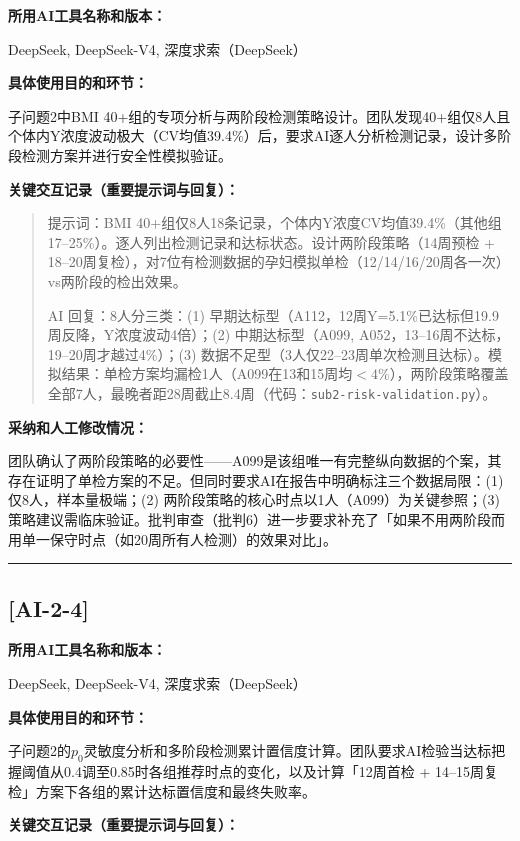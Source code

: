 \documentclass[12pt,a4paper]{ctexart}
\begin{document}
\textbf{所用AI工具名称和版本：}

DeepSeek, DeepSeek-V4, 深度求索（DeepSeek）

\textbf{具体使用目的和环节：}

子问题2中BMI 40+组的专项分析与两阶段检测策略设计。团队发现40+组仅8人且个体内Y浓度波动极大（CV均值39.4\%）后，要求AI逐人分析检测记录，设计多阶段检测方案并进行安全性模拟验证。

\textbf{关键交互记录（重要提示词与回复）：}

\begin{quote}
提示词：BMI 40+组仅8人18条记录，个体内Y浓度CV均值39.4\%（其他组17--25\%）。逐人列出检测记录和达标状态。设计两阶段策略（14周预检 + 18--20周复检），对7位有检测数据的孕妇模拟单检（12/14/16/20周各一次）vs两阶段的检出效果。

AI 回复：8人分三类：(1) 早期达标型（A112，12周Y=5.1\%已达标但19.9周反降，Y浓度波动4倍）；(2) 中期达标型（A099, A052，13--16周不达标，19--20周才越过4\%）；(3) 数据不足型（3人仅22--23周单次检测且达标）。模拟结果：单检方案均漏检1人（A099在13和15周均$<4\%$），两阶段策略覆盖全部7人，最晚者距28周截止8.4周（代码：\texttt{sub2-risk-validation.py}）。
\end{quote}

\textbf{采纳和人工修改情况：}

团队确认了两阶段策略的必要性——A099是该组唯一有完整纵向数据的个案，其存在证明了单检方案的不足。但同时要求AI在报告中明确标注三个数据局限：(1) 仅8人，样本量极端；(2) 两阶段策略的核心时点以1人（A099）为关键参照；(3) 策略建议需临床验证。批判审查（批判6）进一步要求补充了「如果不用两阶段而用单一保守时点（如20周所有人检测）的效果对比」。

\vspace{1em}
\hrule
\vspace{1em}

\subsection*{[AI-2-4]}

\textbf{所用AI工具名称和版本：}

DeepSeek, DeepSeek-V4, 深度求索（DeepSeek）

\textbf{具体使用目的和环节：}

子问题2的$p_0$灵敏度分析和多阶段检测累计置信度计算。团队要求AI检验当达标把握阈值从0.4调至0.85时各组推荐时点的变化，以及计算「12周首检 + 14--15周复检」方案下各组的累计达标置信度和最终失败率。

\textbf{关键交互记录（重要提示词与回复）：}
\end{document}
